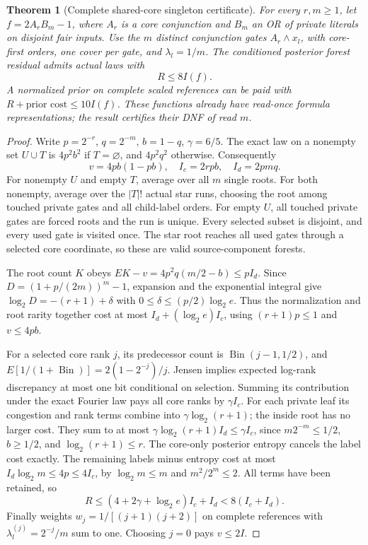 \documentclass[11pt]{article}
\newtheorem{theorem}{Theorem}
\begin{document}
\begin{theorem}[Complete shared-core singleton certificate]
For every $r,m\ge1$, let $f=2A_rB_m-1$, where $A_r$ is a core
conjunction and $B_m$ an OR of private literals on disjoint fair inputs.
Use the $m$ distinct conjunction gates $A_r\wedge x_l$, with core-first
orders, one cover per gate, and $\lambda_l=1/m$. The conditioned
posterior forest residual admits actual laws with
\[
 R\le 8 I(f).
\]
A normalized prior on complete scaled references can be paid with
$R+\text{prior cost}\le10I(f)$. These functions already have read-once
formula representations; the result certifies their DNF of read $m$.
\end{theorem}
\begin{proof}
Write $p=2^{-r}$, $q=2^{-m}$, $b=1-q$, $\gamma=6/5$.
The exact law on a nonempty set $U\cup T$ is $4p^2b^2$ if
$T=\varnothing$, and $4p^2q^2$ otherwise. Consequently
\[
 v=4pb(1-pb),\quad I_c=2rpb,\quad I_d=2pmq.
\]
For nonempty $U$ and empty $T$, average over all $m$ single roots.
For both nonempty, average over the $|T|!$ actual star runs, choosing
the root among touched private gates and all child-label orders.
For empty $U$, all touched private gates are forced roots and the run
is unique. Every selected subset is disjoint, and every used gate is
visited once. The star root reaches all used gates through a selected
core coordinate, so these are valid source-component forests.

The root count $K$ obeys
$E K-v=4p^2q(m/2-b)\le pI_d$.
Since $D=(1+p/(2m))^m-1$, expansion and the exponential integral give
$\log_2D=-(r+1)+\delta$ with $0\le\delta\le(p/2)\log_2 e$.
Thus the normalization and root rarity together cost at most
$I_d+(\log_2e)I_c$, using $(r+1)p\le1$ and $v\le4pb$.

For a selected core rank $j$, its predecessor count is
$\operatorname{Bin}(j-1,1/2)$, and
$E[1/(1+\operatorname{Bin})]=2(1-2^{-j})/j$.
Jensen implies expected log-rank discrepancy at most one bit
conditional on selection. Summing its contribution under the exact
Fourier law pays all core ranks by $\gamma I_c$.
For each private leaf its congestion and rank terms combine into
$\gamma\log_2(r+1)$; the inside root has no larger cost.
They sum to at most $\gamma\log_2(r+1)I_d\le\gamma I_c$, since
$m2^{-m}\le1/2$, $b\ge1/2$, and $\log_2(r+1)\le r$.
The core-only posterior entropy cancels the label cost exactly.
The remaining labels minus entropy cost at most
$I_d\log_2m\le4p\le4I_c$, by $\log_2m\le m$ and $m^2/2^m\le2$.
All terms have been retained, so
\[
 R\le(4+2\gamma+\log_2e)I_c+I_d<8(I_c+I_d).
\]
Finally weights $w_j=1/[(j+1)(j+2)]$ on complete references with
$\lambda_l^{(j)}=2^{-j}/m$ sum to one. Choosing $j=0$ pays $v\le2I$.
\end{proof}
\end{document}
